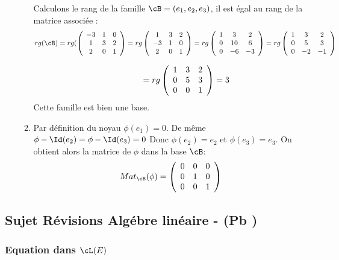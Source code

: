 \begin{correction}
\begin{enumerate}
\begin{enumerate}
Calculons le rang de la famille $\cB =(e_1, e_2, e_3)$, il est égal au rang de la matrice  associée : 
$$rg(\cB) = rg ( \left(\begin{array}{ccc}
-3 & 1 &0 \\
1 & 3 &2 \\
2 & 0 &1 
\end{array}\right)  = rg \left(\begin{array}{ccc}
1 & 3 &2 \\
-3 & 1 &0 \\
2 & 0 &1 
\end{array}\right)  = rg \left(\begin{array}{ccc}
1 & 3 &2 \\
0 & 10 &6 \\
0 & -6 &-3
\end{array}\right)=rg \left(\begin{array}{ccc}
1 & 3 &2 \\
0 & 5 &3 \\
0 & -2 &-1
\end{array}\right)  $$

$$\phantom{rg(\cB)} =rg \left(\begin{array}{ccc}
1 & 3 &2 \\
0 & 5 &3 \\
0 & 0 &1
\end{array}\right)  =3$$
Cette famille est bien une base. 

\item Par définition du noyau $\phi(e_1) = 0$. De même $\phi-\Id (e_2) = \phi-\Id (e_3) =0$ Donc 
$\phi(e_2)=e_2 $ et $\phi(e_3)= e_3$. 
On obtient alors la matrice de $\phi$ dans la base $\cB$:
$$Mat_{\cB} (\phi)  =\left(\begin{array}{ccc}
0 & 0&0 \\
0 & 1 &0 \\
0 & 0 &1
\end{array}\right) $$

\end{enumerate}
\end{enumerate}
\end{correction}




\subsection{Sujet Révisions Algébre linéaire - (Pb )  }
\subsubsection{Equation dans $\cL(E)$ }

